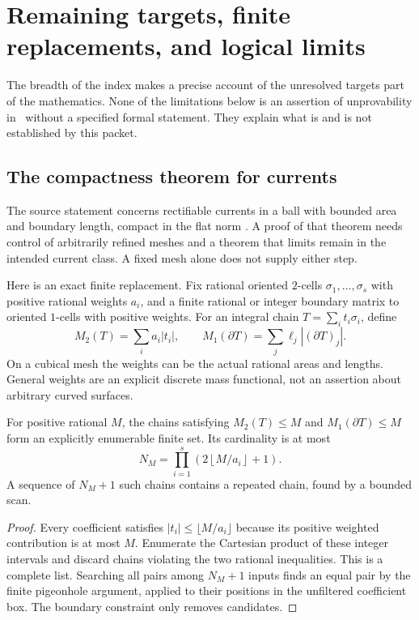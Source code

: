 \section{Remaining targets, finite replacements, and logical limits}
\label{sec:limits}

The breadth of the index makes a precise account of the unresolved targets part of the mathematics. None of the limitations below is an assertion of unprovability in \ipra\ without a specified formal statement. They explain what is and is not established by this packet.

\subsection{The compactness theorem for currents}

The source statement concerns rectifiable currents in a ball with bounded area and boundary length, compact in the flat norm \cite{MWCurrents}. A proof of that theorem needs control of arbitrarily refined meshes and a theorem that limits remain in the intended current class. A fixed mesh alone does not supply either step.

Here is an exact finite replacement. Fix rational oriented $2$-cells $\sigma_1,\ldots,\sigma_s$ with positive rational weights $a_i$, and a finite rational or integer boundary matrix to oriented $1$-cells with positive weights. For an integral chain $T=\sum_i t_i\sigma_i$, define
\[
 M_2(T)=\sum_i a_i|t_i|,\qquad
 M_1(\partial T)=\sum_j \ell_j|(\partial T)_j|.
\]
On a cubical mesh the weights can be the actual rational areas and lengths. General weights are an explicit discrete mass functional, not an assertion about arbitrary curved surfaces.

\begin{theorem}\label{thm:finite-currents}
For positive rational $M$, the chains satisfying
$M_2(T)\leq M$ and $M_1(\partial T)\leq M$ form an explicitly enumerable finite set. Its cardinality is at most
\[
 N_M=\prod_{i=1}^s\left(2\left\lfloor M/a_i\right\rfloor+1\right).
\]
A sequence of $N_M+1$ such chains contains a repeated chain, found by a bounded scan.
\end{theorem}
\begin{proof}
Every coefficient satisfies
$|t_i|\leq\lfloor M/a_i\rfloor$ because its positive weighted contribution is at most $M$. Enumerate the Cartesian product of these integer intervals and discard chains violating the two rational inequalities. This is a complete list. Searching all pairs among $N_M+1$ inputs finds an equal pair by the finite pigeonhole argument, applied to their positions in the unfiltered coefficient box. The boundary constraint only removes candidates.
\end{proof}

